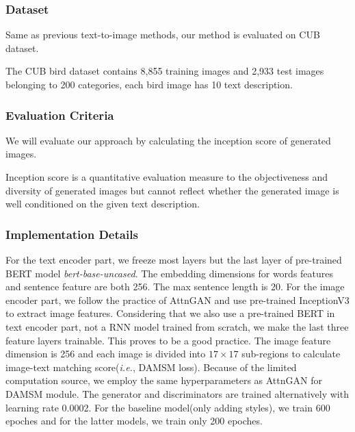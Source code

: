 \documentclass{article}
\begin{document}
\subsubsection{Dataset}

Same as previous text-to-image methods\cite{attngan,mirrorgan}, our method is evaluated on CUB dataset.\cite{WahCUB_200_2011}

The CUB bird dataset contains 8,855 training images and 2,933
test images belonging to 200 categories, each bird image has 10 text description.

\subsubsection{Evaluation Criteria}

We will evaluate our approach by calculating the inception score\cite{inception} of generated images.

Inception score is a quantitative evaluation measure to the objectiveness and diversity of generated images but cannot reflect whether the generated image is well conditioned on the given text description. 




\subsubsection{Implementation Details}
For the text encoder part, we freeze most layers but the last layer of pre-trained BERT model \textit{bert-base-uncased}. The embedding dimensions for words features and sentence feature are both 256. The max sentence length is 20. For the image encoder part, we follow the practice of AttnGAN\cite{attngan} and use pre-trained InceptionV3\cite{inception2} to extract image features. Considering that we also use a pre-trained BERT in text encoder part, not a RNN model trained from scratch, we make the last three feature layers trainable. This proves to be a good practice. The image feature dimension is 256 and each image is divided into $17 \times 17$ sub-regions to calculate image-text matching score(\textit{i.e.}, DAMSM loss). Because of the limited computation source, we employ the same hyperparameters as AttnGAN\cite{attngan} for DAMSM module. The generator and discriminators are trained alternatively with learning rate 0.0002. For the baseline model(only adding styles), we train 600 epoches and for the latter models, we train only 200 epoches.
\end{document}
